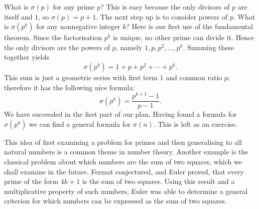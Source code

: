 \documentclass[a4paper]{article}
\begin{document}
What is \(\sigma(p)\) for any prime \(p\)? This is easy because the only divisors of \(p\) are itself and \(1\),
so \(\sigma(p)=p+1\). The next step up is to consider powers of \(p\). What is \(\sigma(p^k)\) for any nonnegative integer \(k\)?
Here is our first use of the fundamental theorem. Since the factorisation \(p^k\) is unique, no other prime can divide it.
Hence the only divisors are the powers of \(p\), namely \(1,p,p^2,\ldots,p^k\). Summing these together yields
\[\sigma(p^k)=1+p+p^2+\cdots+p^k.\]
This sum is just a geometric series with first term \(1\) and common ratio \(p\); therefore it has the following nice formula:
\[\sigma(p^k)=\frac{p^{k+1}-1}{p-1}.\]
We have succeeded in the first part of our plan. Having found a formula for \(\sigma(p^k)\) we can find a general
formula for \(\sigma(n)\). This is left as an exercise.

This idea of first examining a problem for primes and then generalising to all natural numbers is a common theme
in number theory. Another example is the classical problem about which numbers are the sum of two squares, which we shall examine in the future.
Fermat conjectured, and Euler proved, that every prime of the form \(4k+1\) is the sum of two squares. Using this result
and a multiplicative property of such numbers, Euler
was able to determine a general criterion for which numbers can be expressed as the sum of two squares. 
\end{document}
